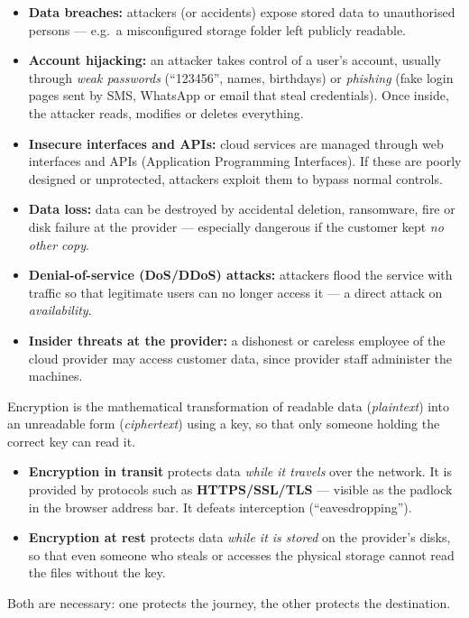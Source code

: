 \documentclass[11pt]{article}
\newcommand{\cle}[1]{{\popxbold\color{popdark}#1}}
\newcounter{popsec}
\newcounter{popsub}
\newcommand{\courssub}[1]{%
  \stepcounter{popsub}%
  \par\vspace{9pt}\noindent{\popxbold\fontsize{11.5}{13}\selectfont\color{popink}{\color{poporange}\thepopsec.\thepopsub}\hspace{6pt}#1}\par\nopagebreak\vspace{4pt}
}
\begin{document}
\begin{itemize}
\item \textbf{Data breaches:} attackers (or accidents) expose stored data to unauthorised persons — e.g.\ a misconfigured storage folder left publicly readable.
\item \textbf{Account hijacking:} an attacker takes control of a user's account, usually through \emph{weak passwords} (``123456'', names, birthdays) or \emph{phishing} (fake login pages sent by SMS, WhatsApp or email that steal credentials). Once inside, the attacker reads, modifies or deletes everything.
\item \textbf{Insecure interfaces and APIs:} cloud services are managed through web interfaces and \cle{APIs} (Application Programming Interfaces). If these are poorly designed or unprotected, attackers exploit them to bypass normal controls.
\item \textbf{Data loss:} data can be destroyed by accidental deletion, ransomware, fire or disk failure at the provider — especially dangerous if the customer kept \emph{no other copy}.
\item \textbf{Denial-of-service (DoS/DDoS) attacks:} attackers flood the service with traffic so that legitimate users can no longer access it — a direct attack on \emph{availability}.
\item \textbf{Insider threats at the provider:} a dishonest or careless employee of the cloud provider may access customer data, since provider staff administer the machines.
\end{itemize}

\courssub{Protection Measures}

\begin{definition}
\cle{Encryption} is the mathematical transformation of readable data (\emph{plaintext}) into an unreadable form (\emph{ciphertext}) using a key, so that only someone holding the correct key can read it.
\begin{itemize}
\item \textbf{Encryption in transit} protects data \emph{while it travels} over the network. It is provided by protocols such as \textbf{HTTPS/SSL/TLS} — visible as the padlock in the browser address bar. It defeats interception (``eavesdropping'').
\item \textbf{Encryption at rest} protects data \emph{while it is stored} on the provider's disks, so that even someone who steals or accesses the physical storage cannot read the files without the key.
\end{itemize}
Both are necessary: one protects the journey, the other protects the destination.
\end{definition}
\end{document}
